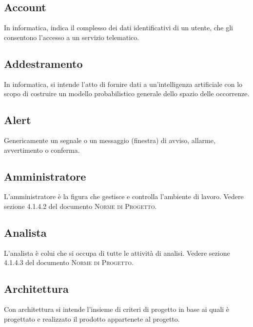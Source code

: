 

\subsection*{Account}
In informatica, indica il complesso dei dati identificativi di un utente, che gli consentono l'accesso a un servizio telematico.

\subsection*{Addestramento}
In informatica, si intende l'atto di fornire dati a un'intelligenza artificiale con lo scopo di costruire un modello probabilistico generale dello spazio delle occorrenze.

\subsection*{Alert}
Genericamente un segnale o un messaggio (finestra) di avviso, allarme, avvertimento o conferma.

\subsection*{Amministratore}
L’amministratore è la figura che gestisce e controlla l’ambiente di lavoro. Vedere sezione 4.1.4.2 del documento \textsc{Norme di Progetto}.

\subsection*{Analista}
L’analista è colui che si occupa di tutte le attività di analisi. Vedere sezione 4.1.4.3 del documento \textsc{Norme di Progetto}.

\subsection*{Architettura}
Con architettura si intende l'insieme di criteri di progetto in base ai quali è progettato e realizzato il prodotto appartenete al progetto.

